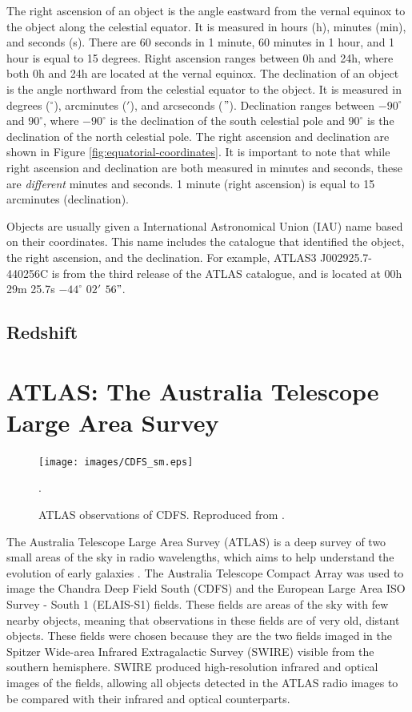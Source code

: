             The right ascension of an object is the angle eastward from the vernal equinox to the object along the celestial equator. It is measured in hours (h), minutes (min), and seconds (s). There are 60 seconds in 1 minute, 60 minutes in 1 hour, and 1 hour is equal to 15 degrees. Right ascension ranges between 0h and 24h, where both 0h and 24h are located at the vernal equinox. The declination of an object is the angle northward from the celestial equator to the object. It is measured in degrees (${}^\circ$), arcminutes ($'$), and arcseconds ($"$). Declination ranges between $-90^\circ$ and $90^\circ$, where $-90^\circ$ is the declination of the south celestial pole and $90^\circ$ is the declination of the north celestial pole. The right ascension and declination are shown in Figure \ref{fig:equatorial-coordinates}. It is important to note that while right ascension and declination are both measured in minutes and seconds, these are \emph{different} minutes and seconds. 1 minute (right ascension) is equal to 15 arcminutes (declination).

            Objects are usually given a International Astronomical Union (IAU) name based on their coordinates. This name includes the catalogue that identified the object, the right ascension, and the declination. For example, ATLAS3 J002925.7-440256C is from the third release of the ATLAS catalogue, and is located at 00h 29m 25.7s $-44^\circ$ $02'$ $56"$.


        \subsection{Redshift}

    \section{ATLAS: The Australia Telescope Large Area Survey}

        \begin{figure}[!ht]
          \texttt{[image: images/CDFS\_sm.eps]}
          \caption{ATLAS observations of CDFS. Reproduced from \citet{franzen15}.}.
          \label{fig:cdfs}
        \end{figure}

        The Australia Telescope Large Area Survey (ATLAS) is a deep  survey of two small areas of the sky in radio wavelengths, which aims to help understand the evolution of early galaxies \citep{norris06}. The Australia Telescope Compact Array was used to image the Chandra Deep Field South (CDFS) and the European Large Area ISO Survey - South 1 (ELAIS-S1) fields. These fields are areas of the sky with few nearby objects, meaning that observations in these fields are of very old, distant objects. These fields were chosen because they are the two fields imaged in the Spitzer Wide-area Infrared Extragalactic Survey (SWIRE) visible from the southern hemisphere. SWIRE produced high-resolution infrared and optical images of the fields, allowing all objects detected in the ATLAS radio images to be compared with their infrared and optical counterparts.

